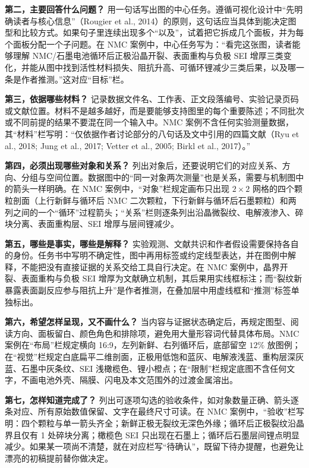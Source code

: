 \textbf{第二，主要回答什么问题？} 用一句话写出图的中心任务。遵循可视化设计中“先明确读者与核心信息”（Rougier et al., 2014）的原则，这句话应当具体到能决定图型和比较方式。如果句子里连续出现多个“以及”，试着把它拆成几个面板，并为每个面板分配一个子问题。在 NMC 案例中，中心任务写为：“看完这张图，读者能够理解 NMC/石墨电池循环后正极沿晶开裂、表面重构与负极 SEI 增厚三类变化，并能从图中找到活性材料损失、阻抗升高、可循环锂减少三类后果，以及哪一条是作者推测。”这对应“目标”栏。

\textbf{第三，依据哪些材料？} 记录数据文件名、工作表、正文段落编号、实验记录页码或文献位置。材料不是越多越好，而是要能够支持图里的每个重要陈述；不同批次或不同前提的结果不要混在同一个输入中。NMC 案例不含任何实验测量数据，其“材料”栏写明：“仅依据作者讨论部分的八句话及文中引用的四篇文献（Ryu et al., 2018; Jung et al., 2017; Vetter et al., 2005; Birkl et al., 2017）。”

\textbf{第四，必须出现哪些对象和关系？} 列出对象后，还要说明它们的对应关系、方向、分组与空间位置。数据图中的“同一对象两次测量”也是关系，需要与机制图中的箭头一样明确。在 NMC 案例中，“对象”栏规定画布只出现 $2\times 2$ 网格的四个颗粒剖面（上行新鲜与循环后 NMC 二次颗粒，下行新鲜与循环后石墨颗粒）和两列之间的一个“循环”过程箭头；“关系”栏则逐条列出沿晶微裂纹、电解液渗入、碎块分离、表面重构层、SEI 增厚与层间锂减少。

\textbf{第五，哪些是事实，哪些是解释？} 实验观测、文献共识和作者假设需要保持各自的身份。任务书中写明不确定性，图中再用标签或约定线型表达，并在图例中解释，不能把没有直接证据的关系交给工具自行决定。在 NMC 案例中，晶界开裂、表面重构与负极 SEI 增厚为文献确立机制，其后果用实线框标注；而“裂纹新暴露表面副反应参与阻抗上升”是作者推测，在叠加层中用虚线框和“推测”标签单独标出。

\textbf{第六，希望怎样呈现，又不画什么？} 当内容与证据状态确定后，再规定图型、阅读方向、面板留白、颜色角色和排除项，避免用大量形容词代替具体布局。NMC 案例在“布局”栏规定横向 16:9，左列新鲜、右列循环后，底部留空 $12\%$ 放图例；在“视觉”栏规定白底扁平二维剖面，正极用低饱和蓝灰、电解液浅蓝、重构层深灰蓝、石墨中灰条纹、SEI 浅橄榄色、锂小橙点；在“限制”栏规定底图不含任何文字，不画电池外壳、隔膜、闪电及本文范围外的过渡金属溶出。

\textbf{第七，怎样知道完成了？} 列出可逐项勾选的验收条件，如对象数量正确、箭头逐条对应、所有原始数值保留、文字在最终尺寸可读。在 NMC 案例中，“验收”栏写明：四个颗粒与单一箭头齐全；新鲜正极无裂纹无深色外缘；循环后正极裂纹沿晶界且仅有 1 处碎块分离；橄榄色 SEI 只出现在石墨上；循环后石墨层间锂点明显减少。如果某一项尚不清楚，就在对应栏写“待确认”，既留下待办提醒，也避免让漂亮的初稿提前替你做决定。

